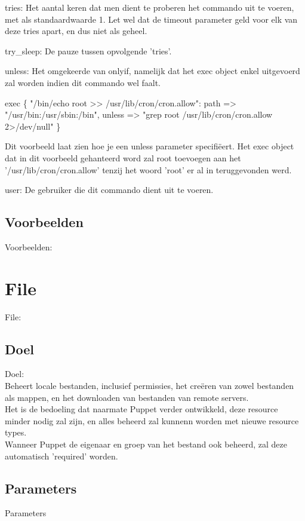 		tries:
		Het aantal keren dat men dient te proberen het commando uit te voeren, met als standaardwaarde 1.
		Let wel dat de timeout parameter geld voor elk van deze tries apart, en dus niet als geheel.

		try\_sleep:
		De pauze tussen opvolgende 'tries'.

		unless:
		Het omgekeerde van onlyif, namelijk dat het exec object enkel uitgevoerd zal worden indien dit commando wel faalt.

			exec \{ "/bin/echo root >> /usr/lib/cron/cron.allow":
				path => "/usr/bin:/usr/sbin:/bin",
				unless => "grep root /usr/lib/cron/cron.allow 2>/dev/null"
			\}

		Dit voorbeeld laat zien hoe je een unless parameter specifiëert.
		Het exec object dat in dit voorbeeld gehanteerd word zal root toevoegen aan het '/usr/lib/cron/cron.allow' tenzij het woord 'root' er al in teruggevonden werd.

		user:
		De gebruiker die dit commando dient uit te voeren.

\subsection{Voorbeelden}
Voorbeelden:

\section{File}
File:\\
\subsection{Doel}
Doel:\\
	Beheert locale bestanden, inclusief permissies, het creëren van zowel bestanden als mappen, en het downloaden van bestanden van remote servers.\\
	Het is de bedoeling dat naarmate Puppet verder ontwikkeld, deze resource minder nodig zal zijn, en alles beheerd zal kunnenn worden met nieuwe resource types.\\

	Wanneer Puppet de eigenaar en groep van het bestand ook beheerd, zal deze automatisch 'required' worden.\\

\subsection{Parameters}
	Parameters\\

